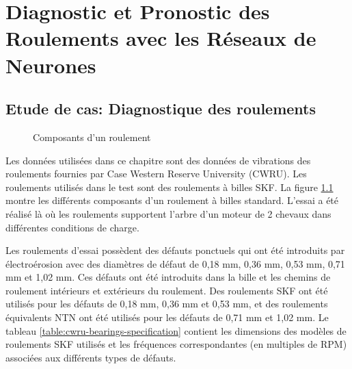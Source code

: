 \chapter{Diagnostic et Pronostic des Roulements avec les Réseaux de Neurones}
\label{chapter:diagnostic-and-prognostic-of-bearings-using-neural-networks}

\section{Etude de cas: Diagnostique des roulements}%
\label{sec:etude_de_cas_diagnostique_des_roulements}

\begin{figure}
    \centering
	
	\caption{Composants d'un roulement}
    \label{figure:skf-bearing-components}    
\end{figure}

Les données utilisées dans ce chapitre sont des données de vibrations des roulements fournies par Case Western Reserve University (CWRU). Les roulements utilisés dans le test sont des roulements à billes SKF. La figure \ref{figure:skf-bearing-components} montre les différents composants d'un roulement à billes standard. L'essai a été réalisé là où les roulements supportent l'arbre d'un moteur de 2 chevaux dans différentes conditions de charge. 

Les roulements d'essai possèdent des défauts ponctuels qui ont été introduits par électroérosion avec des diamètres de défaut de 0,18 mm, 0,36 mm, 0,53 mm, 0,71 mm et 1,02 mm. Ces défauts ont été introduits dans la bille et les chemins de roulement intérieurs et extérieurs du roulement. Des roulements SKF ont été utilisés pour les défauts de 0,18 mm, 0,36 mm et 0,53 mm, et des roulements équivalents NTN ont été utilisés pour les défauts de 0,71 mm et 1,02 mm. Le tableau \ref{table:cwru-bearings-specification} contient les dimensions des modèles de roulements SKF utilisés et les fréquences correspondantes (en multiples de RPM) associées aux différents types de défauts.

